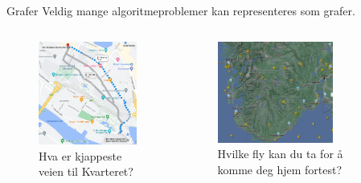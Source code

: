 \begin{frame}[fragile]{Grafer}
    Veldig mange algoritmeproblemer kan representeres som grafer.
    \begin{columns}
        \begin{column}{0.3\textwidth}
            \begin{figure}
                \includegraphics[width=3.8cm]{images/Kvarteret.png}
                \caption{Hva er kjappeste veien til Kvarteret?}
            \end{figure}
        \end{column}
        \pause
        \begin{column}{0.3\textwidth}
            \begin{figure}
                \includegraphics[width=3.8cm]{images/Bergen.png}
                \caption{Hvilke fly kan du ta for å komme deg hjem fortest?}
            \end{figure}
        \end{column}
        \pause
        \begin{column}{0.3\textwidth}
        \end{column}
    \end{columns}
\end{frame}


